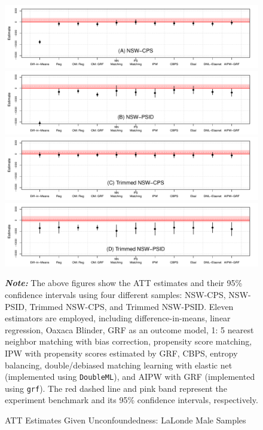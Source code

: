 \documentclass[letterpaper,12pt,leqno]{article}
\begin{document}
\begin{figure}[!ht]
    \caption{ATT Estimates Given Unconfoundedness: LaLonde Male Samples}\label{fig:nsw.att}
    \vspace{-1em}
    \begin{minipage}[c]{1\textwidth}
    \begin{center}
    \includegraphics[width=0.8\linewidth]{coef_nsw_cps.pdf}
    \includegraphics[width=0.8\linewidth]{coef_nsw_psid.pdf}
    \includegraphics[width=0.8\linewidth]{coef_nsw_cps_trim.pdf}
    \includegraphics[width=0.8\linewidth]{coef_nsw_psid_trim.pdf}
    \end{center}    
     {\footnotesize\textbf{\textit{Note:}} The above figures show the ATT estimates and their 95\% confidence intervals using four different samples: NSW-CPS, NSW-PSID, Trimmed NSW-CPS, and Trimmed NSW-PSID. Eleven estimators are employed, including difference-in-means, linear regression, Oaxaca Blinder, GRF as an outcome model, 1: 5 nearest neighbor matching with bias correction, propensity score matching, IPW with propensity scores estimated by GRF, CBPS, entropy balancing, double/debiased matching learning with elastic net (implemented using \texttt{DoubleML}), and AIPW with GRF  (implemented using \texttt{grf}). The red dashed line and pink band represent the experiment benchmark and its 95\% confidence intervals, respectively.}
     \end{minipage}
\end{figure}
\end{document}
